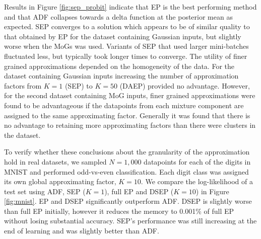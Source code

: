 
Results in Figure \ref{fig:sep_probit} indicate that EP is the best performing method and that ADF collapses towards a delta function at the posterior mean as expected. SEP converges to a solution which appears to be of similar quality to that obtained by EP for the dataset containing Gaussian inputs, but slightly worse when the MoGs was used. Variants of SEP that used larger mini-batches fluctuated less, but typically took longer times to converge. The utility of finer grained approximations depended on the homogeneity of the data. For the dataset containing Gaussian inputs increasing the number of approximation factors from $K=1$ (SEP) to $K=50$ (DAEP) provided no advantage. However, for the second dataset containing MoG inputs, finer grained approximations were found to be advantageous if the datapoints from each mixture component are assigned to the same approximating factor. Generally it was found that there is no advantage to retaining more approximating factors than there were clusters in the dataset.  


To verify whether these conclusions about the granularity of the approximation hold in real datasets, we sampled $N=1,000$ datapoints for each of the digits in MNIST and performed odd-vs-even classification. Each digit class was assigned its own global approximating factor, $K=10$. We compare the log-likelihood of a test set using ADF, SEP ($K=1$), full EP and DSEP ($K=10$) in Figure \ref{fig:mnist}. EP and DSEP significantly outperform ADF. DSEP is slightly worse than full EP initially, however it reduces the memory to 0.001\% of full EP without losing substantial accuracy. SEP's performance was still increasing at the end of learning and was slightly better than ADF.

